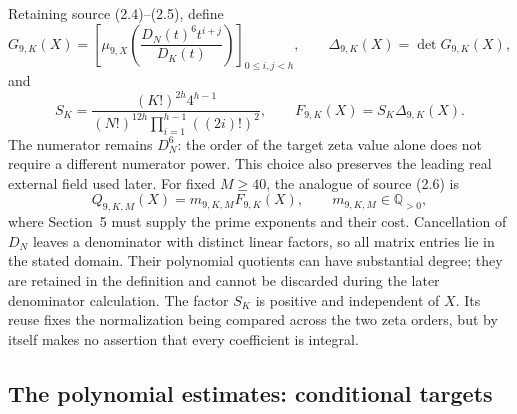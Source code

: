 Retaining source (2.4)--(2.5), define
\begin{equation}
 G_{9,K}(X)=
 \left[\mu_{9,X}\!\left(\frac{D_N(t)^6t^{i+j}}{D_K(t)}\right)
 \right]_{0\leq i,j<h},\qquad
 \Delta_{9,K}(X)=\det G_{9,K}(X),
 \label{s2-matrix}
\end{equation}
and
\begin{equation}
 S_K=\frac{(K!)^{2h}4^{h-1}}
 {(N!)^{12h}\displaystyle\prod_{i=1}^{h-1}((2i)!)^2},
 \qquad F_{9,K}(X)=S_K\Delta_{9,K}(X).
 \label{s2-normalization}
\end{equation}
The numerator remains $D_N^6$: the order of the target zeta value alone
does not require a different numerator power.  This choice also preserves
the leading real external field used later.  For fixed $M\geq40$, the
analogue of source (2.6) is
\begin{equation}
 Q_{9,K,M}(X)=m_{9,K,M}F_{9,K}(X),
 \qquad m_{9,K,M}\in\mathbb Q_{>0},
 \label{s2-Q}
\end{equation}
where Section~5 must supply the prime exponents and their cost.
Cancellation of $D_N$ leaves a denominator with distinct linear factors,
so all matrix entries lie in the stated domain.  Their polynomial
quotients can have substantial degree; they are retained in the
definition and cannot be discarded during the later denominator
calculation.  The factor $S_K$ is positive and independent of $X$.
Its reuse fixes the normalization being compared across the two zeta
orders, but by itself makes no assertion that every coefficient is
integral.

\subsection{The polynomial estimates: conditional targets}
\label{s2-targets}

